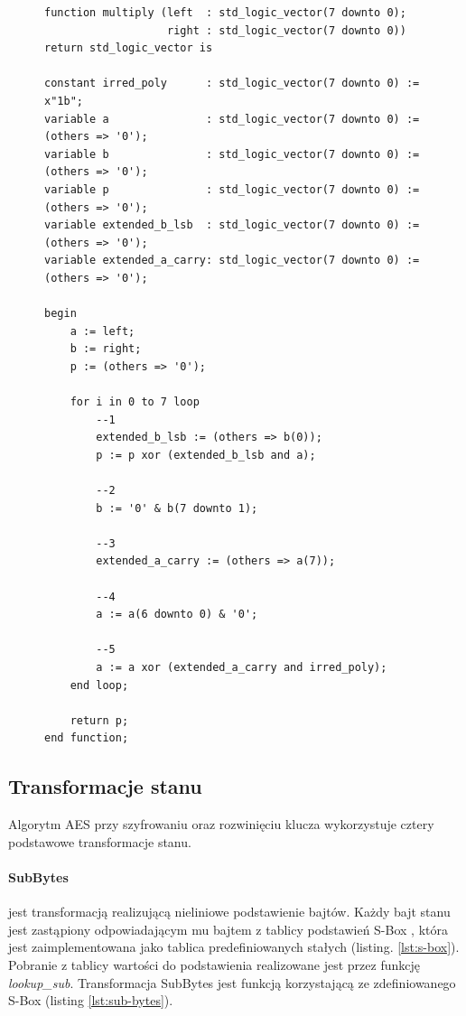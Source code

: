 \begin{figure}[!h]
\begin{lstlisting}[style=vhdl, captionpos=b, caption={Mnożenie wielomianów w ciele \textit{GF($2^8$)}}, label={lst:multiply-impl}]
function multiply (left  : std_logic_vector(7 downto 0); 
                   right : std_logic_vector(7 downto 0)) 
return std_logic_vector is
	
constant irred_poly      : std_logic_vector(7 downto 0) := x"1b";
variable a               : std_logic_vector(7 downto 0) := (others => '0');
variable b               : std_logic_vector(7 downto 0) := (others => '0');
variable p               : std_logic_vector(7 downto 0) := (others => '0');
variable extended_b_lsb  : std_logic_vector(7 downto 0) := (others => '0');
variable extended_a_carry: std_logic_vector(7 downto 0) := (others => '0');

begin
	a := left;
	b := right;
	p := (others => '0');

	for i in 0 to 7 loop
		--1
		extended_b_lsb := (others => b(0));
		p := p xor (extended_b_lsb and a);

		--2
		b := '0' & b(7 downto 1);

		--3
		extended_a_carry := (others => a(7));

		--4
		a := a(6 downto 0) & '0';

		--5
		a := a xor (extended_a_carry and irred_poly);
	end loop;
		
	return p;
end function;
\end{lstlisting}
\end{figure}


\newpage
\subsection{Transformacje stanu}
Algorytm AES przy szyfrowaniu oraz rozwinięciu klucza wykorzystuje cztery podstawowe transformacje stanu.

\paragraph{SubBytes} \cite[rozdz. 5.1.1]{aes-standard} jest transformacją realizującą nieliniowe podstawienie bajtów. Każdy bajt stanu jest zastąpiony odpowiadającym mu bajtem \cite[rys. 6]{aes-standard} z tablicy podstawień S-Box \cite[rys. 7]{aes-standard}, która jest zaimplementowana jako tablica predefiniowanych stałych (listing. \ref{lst:s-box}). Pobranie z tablicy wartości do podstawienia realizowane jest przez funkcję \textit{lookup\_sub}. Transformacja SubBytes jest funkcją korzystającą ze zdefiniowanego S-Box (listing \ref{lst:sub-bytes}).

